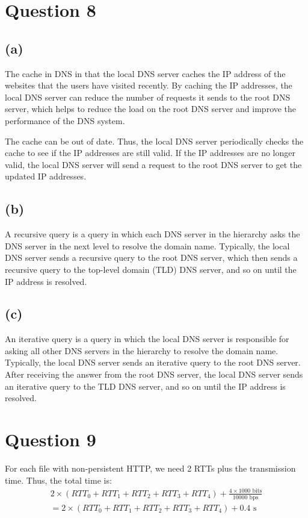 \documentclass[a4paper,12pt]{article}
\begin{document}
\section*{Question 8}

\subsection*{(a)}

The cache in DNS in that the local DNS server caches the IP address of the websites that the users have visited recently. By caching the IP addresses, the local DNS server can reduce the number of requests it sends to the root DNS server, which helps to reduce the load on the root DNS server and improve the performance of the DNS system.

The cache can be out of date. Thus, the local DNS server periodically checks the cache to see if the IP addresses are still valid. If the IP addresses are no longer valid, the local DNS server will send a request to the root DNS server to get the updated IP addresses.

\subsection*{(b)}

A recursive query is a query in which each DNS server in the hierarchy asks the DNS server in the next level to resolve the domain name. Typically, the local DNS server sends a recursive query to the root DNS server, which then sends a recursive query to the top-level domain (TLD) DNS server, and so on until the IP address is resolved.

\subsection*{(c)}

An iterative query is a query in which the local DNS server is responsible for asking all other DNS servers in the hierarchy to resolve the domain name. Typically, the local DNS server sends an iterative query to the root DNS server. After receiving the answer from the root DNS server, the local DNS server sends an iterative query to the TLD DNS server, and so on until the IP address is resolved.

\section*{Question 9}

For each file with non-persistent HTTP, we need 2 RTTs plus the transmission time. Thus, the total time is:
\begin{align*}
  2 \times (RTT_0 + RTT_1 + RTT_2 + RTT_3 + RTT_4) + \frac{4 \times 1000 \text{ bits}}{10000 \text{ bps}} \\ 
  = 2 \times (RTT_0 + RTT_1 + RTT_2 + RTT_3 + RTT_4) + 0.4 \text{ s}
\end{align*}
\end{document}
